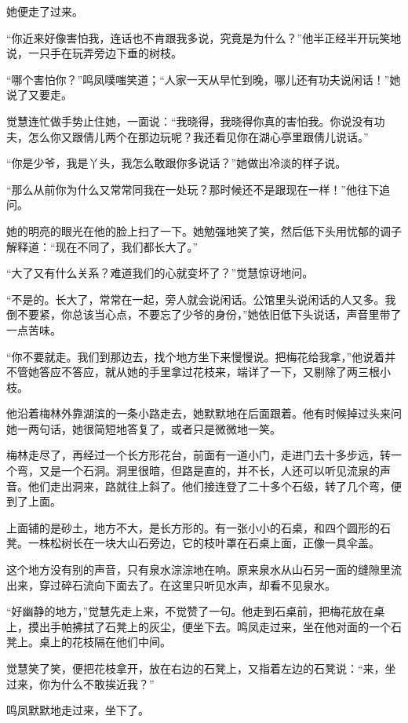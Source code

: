 \par 她便走了过来。
\par “你近来好像害怕我，连话也不肯跟我多说，究竟是为什么？”他半正经半开玩笑地说，一只手在玩弄旁边下垂的树枝。
\par “哪个害怕你？”鸣凤噗嗤笑道；“人家一天从早忙到晚，哪儿还有功夫说闲话！”她说了又要走。
\par 觉慧连忙做手势止住她，一面说：“我晓得，我晓得你真的害怕我。你说没有功夫，怎么你又跟倩儿两个在那边玩呢？我还看见你在湖心亭里跟倩儿说话。”
\par “你是少爷，我是丫头，我怎么敢跟你多说话？”她做出冷淡的样子说。
\par “那么从前你为什么又常常同我在一处玩？那时候还不是跟现在一样！”他往下追问。
\par 她的明亮的眼光在他的脸上扫了一下。她勉强地笑了笑，然后低下头用忧郁的调子解释道：“现在不同了，我们都长大了。”
\par “大了又有什么关系？难道我们的心就变坏了？”觉慧惊讶地问。
\par “不是的。长大了，常常在一起，旁人就会说闲话。公馆里头说闲话的人又多。我倒不要紧，你总该当心点，不要忘了少爷的身份，”她依旧低下头说话，声音里带了一点苦味。
\par “你不要就走。我们到那边去，找个地方坐下来慢慢说。把梅花给我拿，”他说着并不管她答应不答应，就从她的手里拿过花枝来，端详了一下，又剔除了两三根小枝。
\par 他沿着梅林外靠湖滨的一条小路走去，她默默地在后面跟着。他有时候掉过头来问她一两句话，她很简短地答复了，或者只是微微地一笑。
\par 梅林走尽了，再经过一个长方形花台，前面有一道小门，走进门去十多步远，转一个弯，又是一个石洞。洞里很暗，但路是直的，并不长，人还可以听见流泉的声音。他们走出洞来，路就往上斜了。他们接连登了二十多个石级，转了几个弯，便到了上面。
\par 上面铺的是砂土，地方不大，是长方形的。有一张小小的石桌，和四个圆形的石凳。一株松树长在一块大山石旁边，它的枝叶罩在石桌上面，正像一具伞盖。
\par 这个地方没有别的声音，只有泉水淙淙地在响。原来泉水从山石另一面的缝隙里流出来，穿过碎石流向下面去了。在这里只听见水声，却看不见泉水。
\par “好幽静的地方，”觉慧先走上来，不觉赞了一句。他走到石桌前，把梅花放在桌上，摸出手帕拂拭了石凳上的灰尘，便坐下去。鸣凤走过来，坐在他对面的一个石凳上。桌上的花枝隔在他们中间。
\par 觉慧笑了笑，便把花枝拿开，放在右边的石凳上，又指着左边的石凳说：“来，坐过来，你为什么不敢挨近我？”
\par 鸣凤默默地走过来，坐下了。
